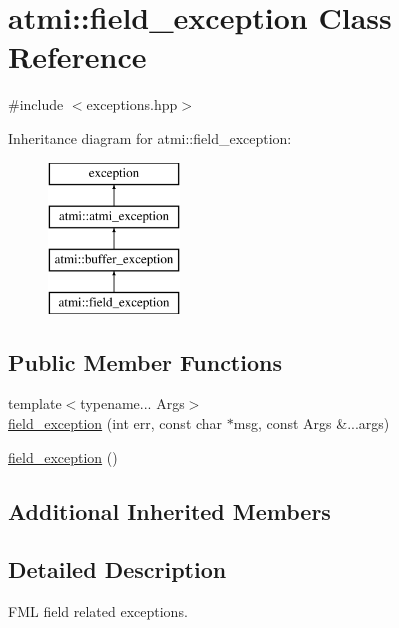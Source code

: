 \hypertarget{classatmi_1_1field__exception}{\section{atmi\+:\+:field\+\_\+exception Class Reference}
\label{classatmi_1_1field__exception}
}


{\ttfamily \#include $<$exceptions.\+hpp$>$}

Inheritance diagram for atmi\+:\+:field\+\_\+exception\+:\begin{figure}[H]
\begin{center}
\leavevmode
\includegraphics[height=4.000000cm]{classatmi_1_1field__exception}
\end{center}
\end{figure}
\subsection*{Public Member Functions}
\begin{DoxyCompactItemize}
\item 
{\footnotesize template$<$typename... Args$>$ }\\\hyperlink{classatmi_1_1field__exception_a53baac9babaeb6822ca0dc59c86a5f5c}{field\+\_\+exception} (int err, const char $\ast$msg, const Args \&...args)
\item 
\hyperlink{classatmi_1_1field__exception_aa79af1412addb5ce0b2c9a3bc41122af}{field\+\_\+exception} ()
\end{DoxyCompactItemize}
\subsection*{Additional Inherited Members}


\subsection{Detailed Description}
F\+M\+L field related exceptions. 

